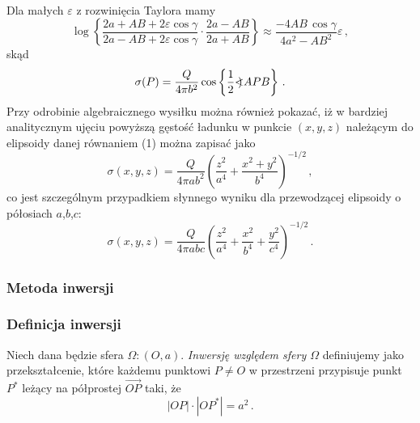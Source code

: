 \documentclass[../main.tex]{subfiles}
\begin{document}
\begin{enumerate}
\begin{equation*}
\begin{split}
\end{split}
\end{equation*}
Dla małych \(\varepsilon\) z rozwinięcia Taylora mamy
\begin{equation*}
    \log\left\{\frac{2a+AB+2\varepsilon\cos\gamma}{2a-AB+2\varepsilon\cos\gamma}\cdot\frac{2a-AB}{2a+AB}\right\}\approx \frac{-4AB\,\cos\gamma}{4a^2-AB^2}\varepsilon\,,
\end{equation*}
skąd
\begin{equation*}
    \sigma(P)=\frac{Q}{4\pi b^2}\cos\left\{\frac{1}{2}\mathord{<\mspace{-9mu}\mathrel{)}\mspace{2mu}} APB\right\}\,.
\end{equation*}
Przy odrobinie algebraicznego wysiłku można również pokazać, iż w bardziej analitycznym ujęciu
powyższą gęstość ładunku w punkcie \((x,y,z)\) należącym do elipsoidy danej równaniem (1) można
zapisać jako
\begin{equation*}
    \sigma(x,y,z)=\frac{Q}{4\pi ab^2}\left(\frac{z^2}{a^4}+\frac{x^2+y^2}{b^4}\right)^{-1/2}\,,
\end{equation*}
co jest szczególnym przypadkiem słynnego wyniku dla przewodzącej elipsoidy o półosiach
\(a\),\(b\),\(c\):
\begin{equation*}
    \sigma(x,y,z)=\frac{Q}{4\pi abc}\left(\frac{z^2}{a^4}+\frac{x^2}{b^4}+\frac{y^2}{c^4}\right)^{-1/2}\,.
\end{equation*}
\end{enumerate}

\subsubsection{Metoda inwersji}
\subsubsection*{Definicja inwersji}
Niech dana będzie sfera \(\Omega:(O,a)\). \textit{Inwersję względem sfery \(\Omega\)} definiujemy
jako przekształcenie, które każdemu punktowi \(P\neq O\) w przestrzeni przypisuje punkt \(P^*\)
leżący na półprostej \(\overrightarrow{OP}\) taki, że
\begin{equation*}
    |OP|\cdot|OP^*|=a^2\,.
\end{equation*}
\end{document}
